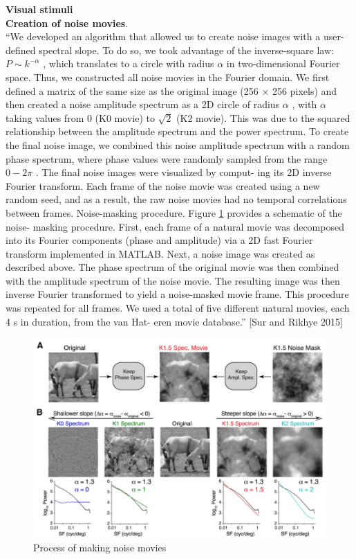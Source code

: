 \documentclass[11pt,paper=a4,answers]{exam}
\begin{document}
\textbf{Visual stimuli}\\
\textbf{Creation of noise movies}.\\
``We developed an algorithm that allowed us to
create noise images with a user-defined spectral slope. To do so, we took
advantage of the inverse-square law: $P \sim k^{-\alpha}$ , which translates to a circle
with radius $\alpha$ in two-dimensional Fourier space. Thus, we constructed all
noise movies in the Fourier domain. We first defined a matrix of the same
size as the original image (256 $\times$ 256 pixels) and then created a noise
amplitude spectrum as a 2D circle of radius $\alpha$ , with $\alpha$ taking values from
0 (K0 movie) to $\sqrt{2}$ (K2 movie). This was due to the squared relationship
between the amplitude spectrum and the power spectrum. To create the
final noise image, we combined this noise amplitude spectrum with a
random phase spectrum, where phase values were randomly sampled
from the range $0 - 2\pi$ . The final noise images were visualized by comput-
ing its 2D inverse Fourier transform. Each frame of the noise movie was
created using a new random seed, and as a result, the raw noise movies
had no temporal correlations between frames.
Noise-masking procedure. Figure \ref{img:noise} provides a schematic of the noise-
masking procedure. First, each frame of a natural movie was decomposed into its Fourier components (phase and amplitude) via a 2D fast Fourier
transform implemented in MATLAB. Next, a noise image was created as
described above. The phase spectrum of the original movie was then
combined with the amplitude spectrum of the noise movie. The resulting
image was then inverse Fourier transformed to yield a noise-masked
movie frame. This procedure was repeated for all frames. We used a total
of five different natural movies, each 4 s in duration, from the van Hat-
eren movie database.'' [Sur and Rikhye 2015]
\begin{figure}
    \centering
    \includegraphics[width=.8\linewidth]{img/noise.png}
    \caption{Process of making noise movies}
    \label{img:noise}
\end{figure}
\end{document}
